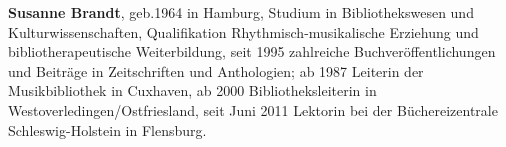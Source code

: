 \textbf{Susanne Brandt}, geb.1964 in Hamburg, Studium in
Bibliothekswesen und Kulturwissenschaften, Qualifikation
Rhythmisch-musikalische Erziehung und bibliotherapeutische
Weiterbildung, seit 1995 zahlreiche Buchveröffentlichungen und Beiträge
in Zeitschriften und Anthologien; ab 1987 Leiterin der Musikbibliothek
in Cuxhaven, ab 2000 Bibliotheksleiterin in
Westoverledingen/Ostfriesland, seit Juni 2011 Lektorin bei der
Büchereizentrale Schleswig-Holstein in Flensburg.
